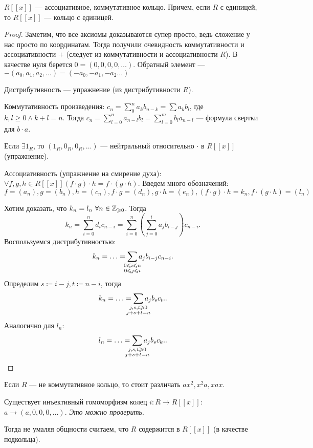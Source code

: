 \begin{theorem}
	$R[[x]]$ --- ассоциативное, коммутативное кольцо. Причем, если  $R$ с единицей, то  $R[[x]]$ --- кольцо с единицей.
\end{theorem}
\begin{proof}
	Заметим, что все аксиомы доказываются супер просто, ведь сложение у нас просто по координатам. Тогда получили очевидность коммутативности и ассоциативности $+$ (следует из коммутативности и ассоциативности $R$). В качестве нуля берется  $0 =(0, 0, 0, 0,\ldots)$. Обратный элемент --- $-(a_0, a_1,a_2,\ldots) = (-a_0, -a_1,-a_2\ldots)$

    Дистрибутивность --- упражнение (из дистрибутивности $R$).
    
    Коммутативность произведения: $c_n = \sum_0^n a_k b_{n-k} = \sum a_k b_l$, где  $k, l \ge 0 \land k+l=n$. Тогда $c_n = \sum_{l=0}^n a_{n-l} b_l = \sum_{l = 0}^m b_l a_{n-l}$ --- формула свертки для $b \cdot a$.

    Если  $\exists 1_R$, то  $(1_R, 0_R, 0_R, \ldots)$ --- нейтральный относительно $\cdot$ в  $R[[x]]$ (упражнение).

    Ассоциативность (упражнение на смирение духа):  $\forall f, g, h \in R[[x]] (f\cdot g) \cdot h = f \cdot (g \cdot h)$. Введем много обозначений: $f=(a_n), g=(b_n), h=(c_n), f \cdot g = (d_n), g \cdot h = (e_n), (f \cdot g) \cdot h = k_n, f \cdot (g \cdot h) = (l_n)$

    Хотим доказать, что $k_n = l_n\ \forall n \in \mathbb{Z}_{\geqslant 0}$. Тогда \[
        k_n = \sum_{i=0}^n d_i c_{n-i} = \sum_{i=0}^n (\sum_{j=0}^i a_jb_{i-j}) c_{n-i}
    .\]  
    Воспользуемся дистрибутивностью: \[
        k_n = \ldots = \sum_{\mathclap{\substack{0 \le i \le n \\ 0 \le j \le i}}} a_j b_{i-j} c_{n-i}
    .\] 
    Определим $s \coloneqq i - j, t \coloneqq n - i$, тогда  \[
    k_n = \ldots = \sum_{\mathclap{\substack{j, s, t \ge 0 \\ j+s+t = n}}} a_jb_sc_t.
    .\] 
    Аналогично для $l_n$:  \[
    l_n = \ldots = \sum_{\mathclap{\substack{j, s, t \ge 0 \\ j+s+t = n}}} a_jb_sc_k.
    .\] 
\end{proof}
\begin{remark}
   Если $R$ --- не коммутативное кольцо, то стоит различать  $ax^2, x^2a, xax$. 
\end{remark}
\begin{remark}
    Существует инъективный гомоморфизм колец $i: R \to R[[x]]$: $a \to (a, 0, 0, 0,\ldots)$. \textit{Это можно проверить}. 

    Тогда не умаляя общности считаем, что $R$ содержится в  $R[[x]]$ (в качестве подкольца).
\end{remark}
